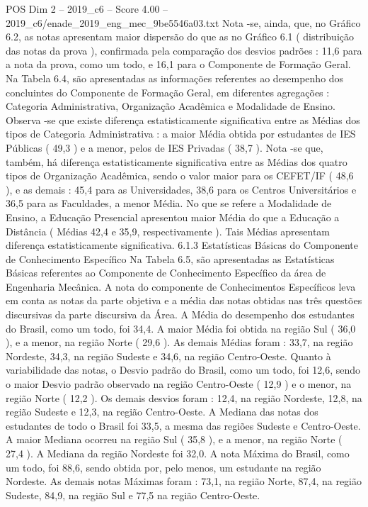 \begin{textsample}{POS Dim 2 – 2019\_c6 – Score 4.00 – 2019\_c6/enade\_2019\_eng\_mec\_9be5546a03.txt}
Nota -se, ainda, que, no Gráfico 6.2, as notas apresentam maior dispersão do que as no Gráfico 6.1 ( distribuição das notas da prova ), confirmada pela comparação dos desvios padrões : 11,6 para a nota da prova, como um todo, e 16,1 para o Componente de Formação Geral.
Na Tabela 6.4, são apresentadas as informações referentes ao desempenho dos concluintes do Componente de Formação Geral, em diferentes agregações : Categoria Administrativa, Organização Acadêmica e Modalidade de Ensino.
Observa -se que existe diferença estatisticamente significativa entre as Médias dos tipos de Categoria Administrativa : a maior Média obtida por estudantes de IES Públicas ( 49,3 ) e a menor, pelos de IES Privadas ( 38,7 ).
Nota -se que, também, há diferença estatisticamente significativa entre as Médias dos quatro tipos de Organização Acadêmica, sendo o valor maior para os CEFET/IF ( 48,6 ), e as demais : 45,4 para as Universidades, 38,6 para os Centros Universitários e 36,5 para as Faculdades, a menor Média.
No que se refere a Modalidade de Ensino, a Educação Presencial apresentou maior Média do que a Educação a Distância ( Médias 42,4 e 35,9, respectivamente ).
Tais Médias apresentam diferença estatisticamente significativa. 6.1.3 Estatísticas Básicas do Componente de Conhecimento Específico Na Tabela 6.5, são apresentadas as Estatísticas Básicas referentes ao Componente de Conhecimento Específico da área de Engenharia Mecânica.
A nota do componente de Conhecimentos Específicos leva em conta as notas da parte objetiva e a média das notas obtidas nas três questões discursivas da parte discursiva da Área.
A Média do desempenho dos estudantes do Brasil, como um todo, foi 34,4.
A maior Média foi obtida na região Sul ( 36,0 ), e a menor, na região Norte ( 29,6 ).
As demais Médias foram : 33,7, na região Nordeste, 34,3, na região Sudeste e 34,6, na região Centro-Oeste.
Quanto à variabilidade das notas, o Desvio padrão do Brasil, como um todo, foi 12,6, sendo o maior Desvio padrão observado na região Centro-Oeste ( 12,9 ) e o menor, na região Norte ( 12,2 ).
Os demais desvios foram : 12,4, na região Nordeste, 12,8, na região Sudeste e 12,3, na região Centro-Oeste.
A Mediana das notas dos estudantes de todo o Brasil foi 33,5, a mesma das regiões Sudeste e Centro-Oeste.
A maior Mediana ocorreu na região Sul ( 35,8 ), e a menor, na região Norte ( 27,4 ).
A Mediana da região Nordeste foi 32,0.
A nota Máxima do Brasil, como um todo, foi 88,6, sendo obtida por, pelo menos, um estudante na região Nordeste.
As demais notas Máximas foram : 73,1, na região Norte, 87,4, na região Sudeste, 84,9, na região Sul e 77,5 na região Centro-Oeste.

\end{textsample}
